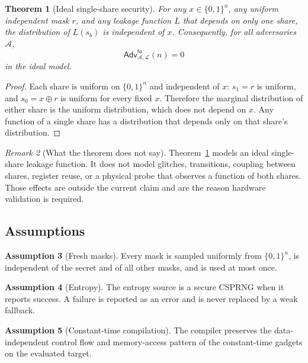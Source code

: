 \documentclass[11pt,a4paper]{article}
\newcommand{\bits}{\{0,1\}}
\newcommand{\Adv}{\mathcal{A}}
\theoremstyle{plain}
\newtheorem{theorem}{Theorem}[section]
\theoremstyle{definition}
\newtheorem{assumption}[theorem]{Assumption}
\theoremstyle{remark}
\newtheorem{remark}[theorem]{Remark}
\begin{document}
\begin{theorem}[Ideal single-share security]\label{thm:ideal}
For any \(x\in\bits^n\), any uniform independent mask \(r\), and any leakage function
\(L\) that depends on only one share, the distribution of \(L(s_b)\) is independent of
\(x\). Consequently, for all adversaries \(\Adv\),
\[
  \mathsf{Adv}^{\mathsf{fo}}_{\Adv,\mathcal{L}}(n)=0
\]
in the ideal model.
\end{theorem}

\begin{proof}
Each share is uniform on \(\bits^n\) and independent of \(x\): \(s_1=r\) is uniform,
and \(s_0=x\oplus r\) is uniform for every fixed \(x\). Therefore the marginal
distribution of either share is the uniform distribution, which does not depend on
\(x\). Any function of a single share has a distribution that depends only on that
share's distribution.
\end{proof}

\begin{remark}[What the theorem does not say]
Theorem~\ref{thm:ideal} models an ideal single-share leakage function. It does not
model glitches, transitions, coupling between shares, register reuse, or a physical
probe that observes a function of both shares. Those effects are outside the current
claim and are the reason hardware validation is required.
\end{remark}

\subsection{Assumptions}

\begin{assumption}[Fresh masks]\label{asm:fresh}
Every mask is sampled uniformly from \(\bits^n\), is independent of the secret and of
all other masks, and is used at most once.
\end{assumption}

\begin{assumption}[Entropy]\label{asm:entropy}
The entropy source is a secure CSPRNG when it reports success. A failure is reported as
an error and is never replaced by a weak fallback.
\end{assumption}

\begin{assumption}[Constant-time compilation]\label{asm:ct}
The compiler preserves the data-independent control flow and memory-access pattern of
the constant-time gadgets on the evaluated target.
\end{assumption}
\end{document}
